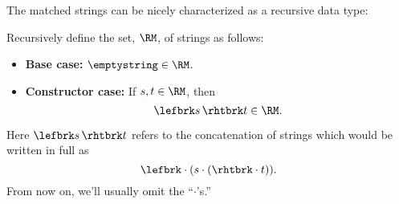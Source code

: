 \iffalse
One precise way to determine if a string is matched is to start with 0 and
read the string from left to right, adding 1 to the count for each left
bracket and subtracting 1 from the count for each right bracket.
For example, here are the counts for the two strings above
\[\begin{array}{rrrrrrrrrrrrr}
& \lefbrk & \rhtbrk & \rhtbrk & \lefbrk & \lefbrk & \lefbrk & \lefbrk &
\lefbrk & \rhtbrk & \rhtbrk & \rhtbrk & \rhtbrk\\
0 & 1 & 0 & -1 & 0 & 1 & 2 & 3 & 4 & 3 & 2 & 1 & 0\\
\\
\\
& \lefbrk & \lefbrk & \lefbrk & \rhtbrk & \rhtbrk & \lefbrk & \rhtbrk &
\rhtbrk & \lefbrk & \rhtbrk\\
0 & 1 & 2 & 3 & 2 & 1 & 2 & 1 & 0 & 1 & 0
\end{array}\]
A string has a \term{good count} if its running count never goes
negative and ends with 0.  So the second string above has a good count, but
the first one does not because its count went negative at the third step.
\begin{definition}\label{gc-def}
Let
\[
\GC \eqdef\  \set{ s \in \brkts \suchthat s\ \text{has a good count}}.
\]
\end{definition}
The matched strings can now be characterized precisely as this set of
strings with good counts.
\fi

The matched strings can be nicely characterized as a recursive data type:

\begin{definition}\label{RM-def}
Recursively define the set, $\RM$, of strings as follows:
\begin{itemize}

\item \textbf{Base case:} $\emptystring \in\RM$.

\item \textbf{Constructor case:} If $s,t \in\RM$, then
\[
\lefbrk s\, \rhtbrk t \in \RM.
\]
\end{itemize}

\end{definition}

Here $\lefbrk s\, \rhtbrk t$ refers to the concatenation of
strings which would be written in full as
\[
\lefbrk \cdot (s \cdot (\rhtbrk \cdot t)).
\]
From now on, we'll usually omit the ``$\cdot$'s.'' 


